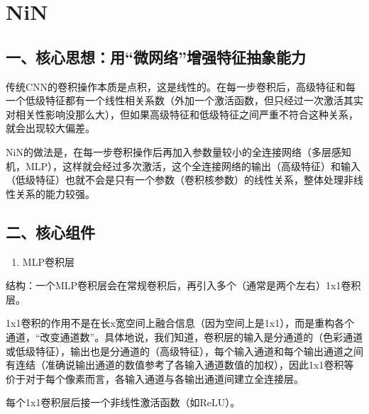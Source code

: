 \setcounter{section}{1}

\hypertarget{nin}{%
\section{NiN}\label{nin}}

\hypertarget{ux4e00ux6838ux5fc3ux601dux60f3ux7528ux5faeux7f51ux7edcux589eux5f3aux7279ux5f81ux62bdux8c61ux80fdux529b}{%
\subsection{一、核心思想：用``微网络''增强特征抽象能力}\label{ux4e00ux6838ux5fc3ux601dux60f3ux7528ux5faeux7f51ux7edcux589eux5f3aux7279ux5f81ux62bdux8c61ux80fdux529b}}

传统CNN的卷积操作本质是点积，这是线性的。在每一步卷积后，高级特征和每一个低级特征都有一个线性相关系数（外加一个激活函数，但只经过一次激活其实对相关性影响没那么大），但如果高级特征和低级特征之间严重不符合这种关系，就会出现较大偏差。

NiN的做法是，在每一步卷积操作后再加入参数量较小的全连接网络（多层感知机，MLP），这样就会经过多次激活，这个全连接网络的输出（高级特征）和输入（低级特征）也就不会是只有一个参数（卷积核参数）的线性关系，整体处理非线性关系的能力较强。

\hypertarget{ux4e8cux6838ux5fc3ux7ec4ux4ef6-1}{%
\subsection{二、核心组件}\label{ux4e8cux6838ux5fc3ux7ec4ux4ef6-1}}

\begin{enumerate}
\def\labelenumi{\arabic{enumi}.}
\tightlist
\item
  MLP卷积层
\end{enumerate}

结构：一个MLP卷积层会在常规卷积后，再引入多个（通常是两个左右）1x1卷积层。

1x1卷积的作用不是在长x宽空间上融合信息（因为空间上是1x1），而是重构各个通道，``改变通道数''。具体地说，我们知道，卷积层的输入是分通道的（色彩通道或低级特征），输出也是分通道的（高级特征），每个输入通道和每个输出通道之间有连结（准确说输出通道的数值参考了各输入通道数值的加权），因此1x1卷积等价于对于每个像素而言，各输入通道与各输出通道间建立全连接层。

每个1x1卷积层后接一个非线性激活函数（如ReLU）。

